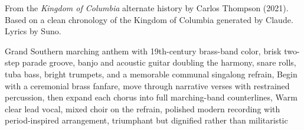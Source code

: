 
\begin{notes}
From the \emph{Kingdom of Columbia} alternate history by Carlos Thompson (2021). Based on a clean chronology of the Kingdom of Columbia generated by Claude. Lyrics by Suno.
\end{notes}
\begin{style}
Grand Southern marching anthem with 19th-century brass-band color, brisk two-step parade groove, banjo and acoustic guitar doubling the harmony, snare rolls, tuba bass, bright trumpets, and a memorable communal singalong refrain, Begin with a ceremonial brass fanfare, move through narrative verses with restrained percussion, then expand each chorus into full marching-band counterlines, Warm clear lead vocal, mixed choir on the refrain, polished modern recording with period-inspired arrangement, triumphant but dignified rather than militaristic
\end{style}
